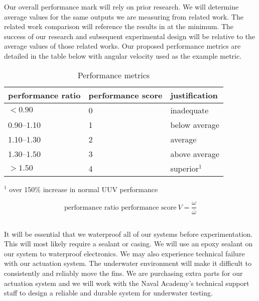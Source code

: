 \documentclass{IEEEtran}
\begin{document}
Our overall performance mark will rely on prior research. We will determine average values for the same outputs we are measuring from related work. The related work comparison will reference the results in \cite{berenice2018splash, orourke2020navy, hiller2012expanding} at the minimum. The success of our research and subsequent experimental design will be relative to the average values of those related works. Our proposed performance metrics are detailed in the table below with angular velocity used as the example metric.
\begin{table}
\caption{Performance metrics}
\label{tab:2}
\begin{center}
\begin{tabular}{lll}
\toprule
performance ratio & performance score & justification \\
\midrule 
$< \num{0.90}$ & 0 & inadequate \\
\numrange{0.90}{1.10} & 1 & below average \\
\numrange{1.10}{1.30} & 2 & average \\
\numrange{1.30}{1.50} & 3 & above average \\
$> \num{1.50}$ & 4 & superior$^1$\\
\bottomrule
\end{tabular}

\vspace{1em}
$^1$ over 150\% increase in normal UUV performance
\end{center}
\end{table}
\begin{equation}
\mbox{performance ratio performance score}\ V = \frac{\omega}{\bar{\omega}}
\label{eq:performance-ratio}
\end{equation}

\subsection{}
It will be essential that we waterproof all of our systems before experimentation. This will most likely require a sealant or casing. We will use an epoxy sealant on our system to waterproof electronics. We may also experience technical failure with our actuation system. The underwater environment will make it difficult to consistently and reliably move the fins. We are purchasing extra parts for our actuation system and we will work with the Naval Academy’s technical support staff to design a reliable and durable system for underwater testing.
\end{document}
